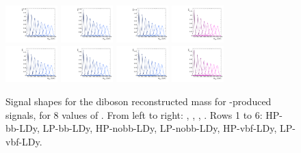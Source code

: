 \begin{figure}[htbp]
  \includegraphics[width=0.18\textwidth]{fig/2Dfit/templateSignalVsMX_fromDC_VBFGbuToWW_MVV_mu_HP_vbf_LDy.pdf}
  \includegraphics[width=0.18\textwidth]{fig/2Dfit/templateSignalVsMX_fromDC_VBFRadToWW_MVV_mu_HP_vbf_LDy.pdf}
  \includegraphics[width=0.18\textwidth]{fig/2Dfit/templateSignalVsMX_fromDC_VBFZprToWW_MVV_mu_HP_vbf_LDy.pdf}
  \includegraphics[width=0.18\textwidth]{fig/2Dfit/templateSignalVsMX_fromDC_VBFWprToWZ_MVV_mu_HP_vbf_LDy.pdf}\\
  \includegraphics[width=0.18\textwidth]{fig/2Dfit/templateSignalVsMX_fromDC_VBFGbuToWW_MVV_mu_LP_vbf_LDy.pdf}
  \includegraphics[width=0.18\textwidth]{fig/2Dfit/templateSignalVsMX_fromDC_VBFRadToWW_MVV_mu_LP_vbf_LDy.pdf}
  \includegraphics[width=0.18\textwidth]{fig/2Dfit/templateSignalVsMX_fromDC_VBFZprToWW_MVV_mu_LP_vbf_LDy.pdf}
  \includegraphics[width=0.18\textwidth]{fig/2Dfit/templateSignalVsMX_fromDC_VBFWprToWZ_MVV_mu_LP_vbf_LDy.pdf}\\
  \caption{
    Signal shapes for the diboson reconstructed mass \MVV for \VBF-produced signals, for 8 values of \MX.
    From left to right: \GBulktoWW, \RadtoWW, \ZprtoWW, \WprtoWZ.
    Rows 1 to 6: HP-bb-LDy, LP-bb-LDy, HP-nobb-LDy, LP-nobb-LDy, HP-vbf-LDy, LP-vbf-LDy.
  }
  \label{fig:MVVShapes_VBF_LDy_Run2}
\end{figure}

